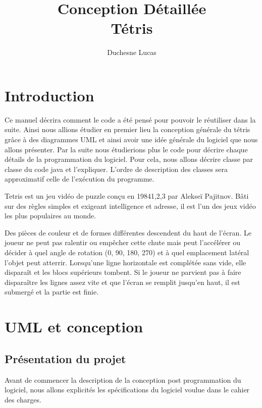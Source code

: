 \documentclass{article}           %
\title{Conception Détaillée\\
Tétris}     %
\author{Duchesne Lucas}        %
\begin{document}

\maketitle                        %
\newpage
\tableofcontents                  %
\newpage
\section{Introduction}            %

Ce manuel décrira comment le code a été pensé pour pouvoir le réutiliser dans la suite. Ainsi nous allions étudier en premier lieu la conception générale du tétris grâce à des diagrammes UML et ainsi avoir une idée générale du logiciel que nous allons présenter.
Par la suite nous étudierions plus le code pour décrire chaque détails de la programmation du logiciel. Pour cela, nous allons décrire classe par classe du code java et l’expliquer. 
L'ordre de description des classes sera approximatif celle de l'exécution du programme.

Tetris est un jeu vidéo de puzzle conçu en 19841,2,3 par Alekseï Pajitnov. Bâti sur des règles simples et exigeant intelligence et adresse, il est l'un des jeux vidéo les plus populaires au monde.

Des pièces de couleur et de formes différentes descendent du haut de l'écran. Le joueur ne peut pas ralentir ou empêcher cette chute mais peut l'accélérer ou décider à quel angle de rotation (0, 90, 180, 270) et à quel emplacement latéral l'objet peut atterrir. Lorsqu'une ligne horizontale est complétée sans vide, elle disparaît et les blocs supérieurs tombent. Si le joueur ne parvient pas à faire disparaître les lignes assez vite et que l'écran se remplit jusqu'en haut, il est submergé et la partie est finie.

\section{UML et conception}

\subsection{Présentation du projet}
Avant de commencer la description de la conception post programmation du logiciel, nous allons explicités les spécifications du logiciel voulue dans le cahier des charges.
\end{document}
